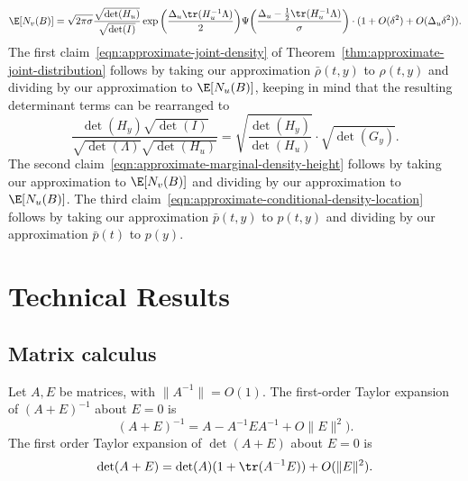 \documentclass{article}
\begin{document}
	\begin{equation*}
		\E[N_v(B)] = \sqrt{2\pi\sigma} \frac{\sqrt{\det(H_u)}}{\sqrt{\det(I)}} \exp\bigg(\frac{\Delta_u \tr(H_u^{-1}\Lambda)}{2}\bigg) \Psi\bigg(\frac{\Delta_u - \frac{1}{2}\tr(H_u^{-1}\Lambda)}{\sigma}\bigg) \cdot (1 + O(\delta^2) + O(\Delta_u\delta^2)).
	\end{equation*}
	The first claim~\eqref{eqn:approximate-joint-density} of Theorem~\ref{thm:approximate-joint-distribution} follows by taking our approximation $\bar{\rho}(t,y)$ to $\rho(t,y)$ and dividing by our approximation to $\E[N_u(B)]$, keeping in mind that the resulting determinant terms can be rearranged to
	\begin{equation*}
		\frac{\det(H_y) \sqrt{\det(I)}}{\sqrt{\det(\Lambda)}\sqrt{\det(H_u)}} = \sqrt{\frac{\det(H_y)}{\det(H_u)}} \cdot \sqrt{\det(G_y)}.
	\end{equation*}
	The second claim~\eqref{eqn:approximate-marginal-density-height} follows by taking our approximation to $\E[N_v(B)]$ and dividing by our approximation to $\E[N_u(B)]$. The third claim~\eqref{eqn:approximate-conditional-density-location} follows by taking our approximation $\bar{p}(t,y)$ to $p(t,y)$ and dividing by our approximation $\bar{p}(t)$ to $p(y)$. 
	
	\section{Technical Results}
	
	\subsection{Matrix calculus}
	Let $A,E$ be matrices, with $\|A^{-1}\| = O(1)$. The first-order Taylor expansion of $(A + E)^{-1}$ about $E = 0$ is
	\begin{equation}
		\label{eqn:matrix-inverse-taylor-expansion}
		(A + E)^{-1} = A - A^{-1} E A^{-1} + O\|E\|^2).
	\end{equation}
	The first order Taylor expansion of $\det(A + E)$ about $E = 0$ is
	\begin{equation}
		\label{eqn:matrix-det-taylor-expansion}
		\det(A + E) = \det(A)(1 + \tr(A^{-1}E)) + O(\|E\|^2). 
	\end{equation}
	
\end{document}
